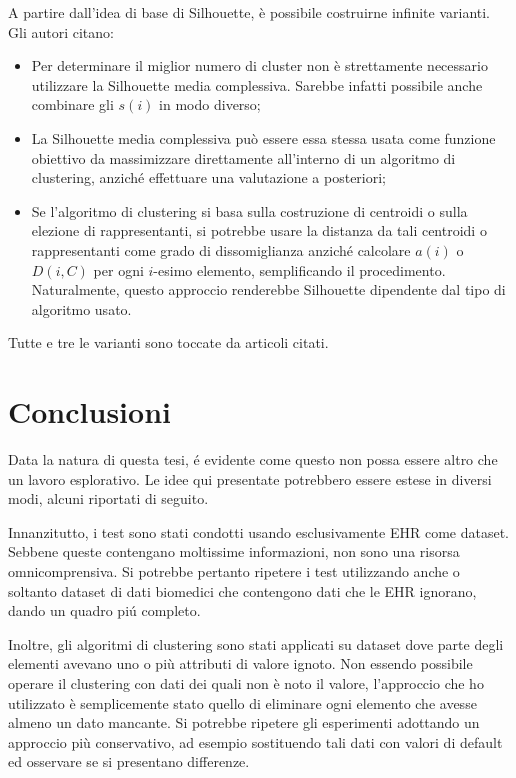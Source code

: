 \documentclass[a4paper, 12pt]{report}
\begin{document}
			A partire dall'idea di base di Silhouette, è possibile costruirne
			infinite varianti. Gli autori citano:

			\begin{itemize}
				\item
				Per determinare il miglior numero di cluster non è strettamente
				necessario utilizzare la Silhouette media complessiva. Sarebbe
				infatti possibile anche combinare gli $s(i)$ in modo diverso;
				\item
				La Silhouette media complessiva può essere essa stessa usata
				come funzione obiettivo da massimizzare direttamente all'interno
				di un algoritmo di clustering, anziché effettuare una valutazione
				a posteriori;
				\item
				Se l'algoritmo di clustering si basa sulla costruzione di centroidi
				o sulla elezione di rappresentanti, si potrebbe usare la distanza
				da tali centroidi o rappresentanti come grado di dissomiglianza
				anziché calcolare $a(i)$ o $D(i, C)$ per ogni $i$-esimo elemento,
				semplificando il procedimento. Naturalmente, questo approccio
				renderebbe Silhouette dipendente dal tipo di algoritmo usato. 
			\end{itemize}

			Tutte e tre le varianti sono toccate da articoli citati.

	\chapter{Conclusioni}

		Data la natura di questa tesi, é evidente come questo non possa
		essere altro che un lavoro esplorativo. Le idee qui presentate
		potrebbero essere estese in diversi modi, alcuni riportati di
		seguito.

		Innanzitutto, i test sono stati condotti usando esclusivamente EHR
		come dataset. Sebbene queste contengano moltissime informazioni, non
		sono una risorsa omnicomprensiva. Si potrebbe pertanto ripetere i
		test utilizzando anche o soltanto dataset di dati biomedici che
		contengono dati che le EHR ignorano, dando un quadro piú completo.

		Inoltre, gli algoritmi di clustering sono stati applicati su dataset
		dove parte degli elementi avevano uno o più attributi di valore
		ignoto. Non essendo possibile operare il clustering con dati dei
		quali non è noto il valore, l'approccio che ho utilizzato è
		semplicemente stato quello di eliminare ogni elemento che avesse
		almeno un dato mancante. Si potrebbe ripetere gli esperimenti
		adottando un approccio più conservativo, ad esempio sostituendo
		tali dati con valori di default ed osservare se si presentano
		differenze.
\end{document}
